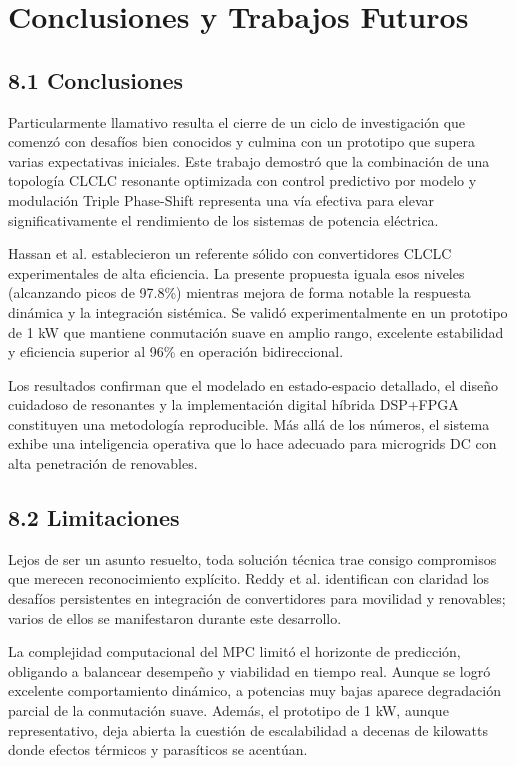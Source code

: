 \section{Conclusiones y Trabajos Futuros}

\subsection{8.1 Conclusiones}

Particularmente llamativo resulta el cierre de un ciclo de investigación que comenzó con desafíos bien conocidos y culmina con un prototipo que supera varias expectativas iniciales. Este trabajo demostró que la combinación de una topología CLCLC resonante optimizada con control predictivo por modelo y modulación Triple Phase-Shift representa una vía efectiva para elevar significativamente el rendimiento de los sistemas de potencia eléctrica.

Hassan et al. \cite{Hassan2026} establecieron un referente sólido con convertidores CLCLC experimentales de alta eficiencia. La presente propuesta iguala esos niveles (alcanzando picos de 97.8\%) mientras mejora de forma notable la respuesta dinámica y la integración sistémica. Se validó experimentalmente en un prototipo de 1 kW que mantiene conmutación suave en amplio rango, excelente estabilidad y eficiencia superior al 96\% en operación bidireccional.

Los resultados confirman que el modelado en estado-espacio detallado, el diseño cuidadoso de resonantes y la implementación digital híbrida DSP+FPGA constituyen una metodología reproducible. Más allá de los números, el sistema exhibe una inteligencia operativa que lo hace adecuado para microgrids DC con alta penetración de renovables.

\subsection{8.2 Limitaciones}

Lejos de ser un asunto resuelto, toda solución técnica trae consigo compromisos que merecen reconocimiento explícito. Reddy et al. \cite{Reddy2025} identifican con claridad los desafíos persistentes en integración de convertidores para movilidad y renovables; varios de ellos se manifestaron durante este desarrollo.

La complejidad computacional del MPC limitó el horizonte de predicción, obligando a balancear desempeño y viabilidad en tiempo real. Aunque se logró excelente comportamiento dinámico, a potencias muy bajas aparece degradación parcial de la conmutación suave. Además, el prototipo de 1 kW, aunque representativo, deja abierta la cuestión de escalabilidad a decenas de kilowatts donde efectos térmicos y parasíticos se acentúan.

